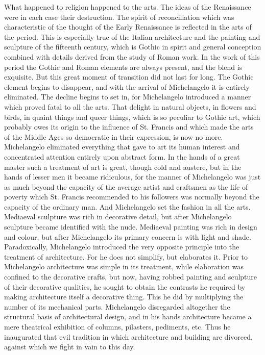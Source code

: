 \documentclass{book}
\begin{document}
What happened to religion happened to the arts. The ideas of the Renaissance were in each case their destruction. The spirit of reconciliation which was characteristic of the thought of the Early Renaissance is reflected in the arts of the period. This is especially true of the Italian architecture and the painting and sculpture of the fifteenth century, which is Gothic in spirit and general conception combined with details derived from the study of Roman work. In the work of this period the Gothic and Roman elements are always present, and the blend is exquisite. But this great moment of transition did not last for long. The Gothic element begins to disappear, and with the arrival of Michelangelo it is entirely eliminated. The decline begins to set in, for Michelangelo introduced a manner which proved fatal to all the arts. That delight in natural objects, in flowers and birds, in quaint things and queer things, which is so peculiar to Gothic art, which probably owes its origin to the influence of St. Francis and which made the arts of the Middle Ages so democratic in their expression, is now no more. Michelangelo eliminated everything that gave to art its human interest and concentrated attention entirely upon abstract form. In the hands of a great master such a treatment of art is great, though cold and austere, but in the hands of lesser men it became ridiculous, for the manner of Michelangelo was just as much beyond the capacity of the average artist and craftsmen as the life of poverty which St. Francis recommended to his followers was normally beyond the capacity of the ordinary man. And Michelangelo set the fashion in all the arts. Mediaeval sculpture was rich in decorative detail, but after Michelangelo sculpture became identified with the nude. Mediaeval painting was rich in design and colour, but after Michelangelo its primary concern is with light and shade. Paradoxically, Michelangelo introduced the very opposite principle into the treatment of architecture. For he does not simplify, but elaborates it. Prior to Michelangelo architecture was simple in its treatment, while elaboration was confined to the decorative crafts, but now, having robbed painting and sculpture of their decorative qualities, he sought to obtain the contrasts he required by making architecture itself a decorative thing. This he did by multiplying the number of its mechanical parts. Michelangelo disregarded altogether the structural basis of architectural design, and in his hands architecture became a mere theatrical exhibition of columns, pilasters, pediments, etc. Thus he inaugurated that evil tradition in which architecture and building are divorced, against which we fight in vain to this day.
\end{document}
